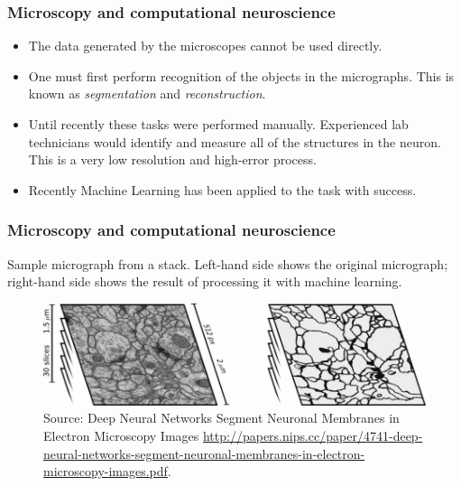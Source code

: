\documentclass{beamer}
\begin{document}
\begin{frame}
\frametitle{Microscopy and computational neuroscience}

\begin{itemize}
\item The data generated by the microscopes cannot be used
  directly.
\pause
\item One must first perform recognition of the objects in the
  micrographs. This is known as \emph{segmentation} and
  \emph{reconstruction}.
\pause
\item Until recently these tasks were performed manually. Experienced
  lab technicians would identify and measure all of the structures in
  the neuron. This is a very low resolution and high-error process.
\pause
\item Recently Machine Learning has been applied to the task with
  success.
\end{itemize}

\end{frame}

\begin{frame}
\frametitle{Microscopy and computational neuroscience}

Sample micrograph from a stack. Left-hand side shows the original
micrograph; right-hand side shows the result of processing it with
machine learning.

\begin{figure}[H]
    \centering
    \includegraphics[scale=0.3]{../blog/images/biomed-neurons}
    \caption{Source: Deep Neural Networks Segment Neuronal Membranes in Electron Microscopy Images
      \url{http://papers.nips.cc/paper/4741-deep-neural-networks-segment-neuronal-membranes-in-electron-microscopy-images.pdf}.}
    \label{fig:stack}
\end{figure}

\end{frame}
\end{document}
